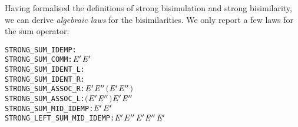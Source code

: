 Having formalised the definitions of strong bisimulation and strong bisimilarity,
we can derive \emph{algebraic laws} for the 
 bisimilarities. We only report a few laws for the sum operator:
\begin{alltt}
STRONG_SUM_IDEMP:          \HOLTokenTurnstile{}  \HOLSymConst{\ensuremath{+}}  \HOLSymConst{\HOLTokenStrongEQ}   
STRONG_SUM_COMM:           \HOLTokenTurnstile{}  \HOLSymConst{\ensuremath{+}} \ensuremath{\HOLFreeVar{E}\sp{\prime}} \HOLSymConst{\HOLTokenStrongEQ} \ensuremath{\HOLFreeVar{E}\sp{\prime}} \HOLSymConst{\ensuremath{+}} 
STRONG_SUM_IDENT_L:        \HOLTokenTurnstile{}  \HOLSymConst{\ensuremath{+}}  \HOLSymConst{\HOLTokenStrongEQ} 
STRONG_SUM_IDENT_R:        \HOLTokenTurnstile{}  \HOLSymConst{\ensuremath{+}}  \HOLSymConst{\HOLTokenStrongEQ} 
STRONG_SUM_ASSOC_R:        \HOLTokenTurnstile{}  \HOLSymConst{\ensuremath{+}} \ensuremath{\HOLFreeVar{E}\sp{\prime}} \HOLSymConst{\ensuremath{+}} \ensuremath{\HOLFreeVar{E}\sp{\prime\prime}} \HOLSymConst{\HOLTokenStrongEQ}  \HOLSymConst{\ensuremath{+}} \ensuremath{(}\ensuremath{\HOLFreeVar{E}\sp{\prime}} \HOLSymConst{\ensuremath{+}} \ensuremath{\HOLFreeVar{E}\sp{\prime\prime}}\ensuremath{)}
STRONG_SUM_ASSOC_L:        \HOLTokenTurnstile{}  \HOLSymConst{\ensuremath{+}} \ensuremath{(}\ensuremath{\HOLFreeVar{E}\sp{\prime}} \HOLSymConst{\ensuremath{+}} \ensuremath{\HOLFreeVar{E}\sp{\prime\prime}}\ensuremath{)} \HOLSymConst{\HOLTokenStrongEQ}  \HOLSymConst{\ensuremath{+}} \ensuremath{\HOLFreeVar{E}\sp{\prime}} \HOLSymConst{\ensuremath{+}} \ensuremath{\HOLFreeVar{E}\sp{\prime\prime}}
STRONG_SUM_MID_IDEMP:      \HOLTokenTurnstile{}  \HOLSymConst{\ensuremath{+}} \ensuremath{\HOLFreeVar{E}\sp{\prime}} \HOLSymConst{\ensuremath{+}}  \HOLSymConst{\HOLTokenStrongEQ} \ensuremath{\HOLFreeVar{E}\sp{\prime}} \HOLSymConst{\ensuremath{+}} 
STRONG_LEFT_SUM_MID_IDEMP: \HOLTokenTurnstile{}  \HOLSymConst{\ensuremath{+}} \ensuremath{\HOLFreeVar{E}\sp{\prime}} \HOLSymConst{\ensuremath{+}} \ensuremath{\HOLFreeVar{E}\sp{\prime\prime}} \HOLSymConst{\ensuremath{+}} \ensuremath{\HOLFreeVar{E}\sp{\prime}} \HOLSymConst{\HOLTokenStrongEQ}  \HOLSymConst{\ensuremath{+}} \ensuremath{\HOLFreeVar{E}\sp{\prime\prime}} \HOLSymConst{\ensuremath{+}} \ensuremath{\HOLFreeVar{E}\sp{\prime}}
\end{alltt}

